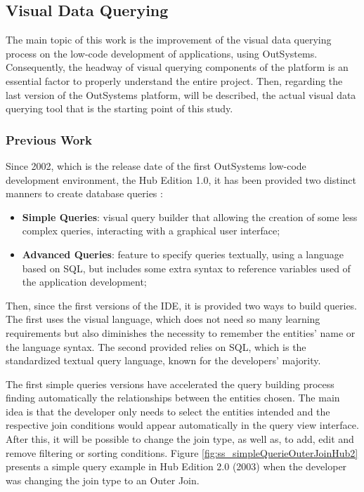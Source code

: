\subsection{Visual Data Querying}
\label{subsec:visual_data_querying}

The main topic of this work is the improvement of the visual data querying process on the low-code development of applications, using OutSystems. Consequently, the headway of visual querying components of the platform is an essential factor to properly understand the entire project. Then, regarding the last version of the OutSystems platform, will be described, the actual visual data querying tool that is the starting point of this study.

\subsubsection{Previous Work}
\label{subsubsec:previous_work}

Since 2002, which is the release date of the first OutSystems low-code development environment, the Hub Edition 1.0, it has been provided two distinct manners to create database queries \cite{whatsNotNewInOutsystems}:

\begin{itemize}
	\item \textbf{Simple Queries}: visual query builder that allowing the creation of some less complex queries, interacting with a graphical user interface;
	\item \textbf{Advanced Queries}: feature to specify queries textually, using a language based on SQL, but includes some extra syntax to reference variables used of the application development;
\end{itemize}

Then, since the first versions of the IDE, it is provided two ways to build queries. The first uses the visual language, which does not need so many learning requirements but also diminishes the necessity to remember the entities' name or the language syntax. The second provided relies on SQL, which is the standardized textual query language, known for the developers' majority.

The first simple queries versions have accelerated the query building process finding automatically the relationships between the entities chosen. The main idea is that the developer only needs to select the entities intended and the respective join conditions would appear automatically in the query view interface. After this, it will be possible to change the join type, as well as, to add, edit and remove filtering or sorting conditions. Figure \ref{fig:ss_simpleQuerieOuterJoinHub2} presents a simple query example in Hub Edition 2.0 (2003) when the developer was changing the join type to an Outer Join.

